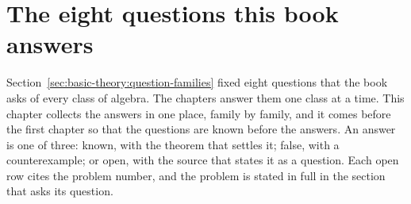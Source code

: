 \chapter*{The eight questions this book answers}\label{app:questions}
%

Section~\ref{sec:basic-theory:question-families} fixed eight questions that the %
book asks of every class of algebra. %
The chapters answer them one class at a time. %
This chapter collects the answers in one place, family by family, and it comes %
before the first chapter so that the questions are known before the answers. %
An answer is one of three: known, with the theorem that settles it; false, with %
a counterexample; or open, with the source that states it as a question. %
Each open row cites the problem number, and the problem is stated in full in %
the section that asks its question. %

